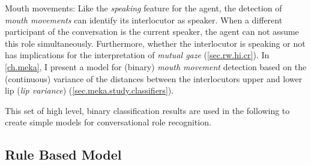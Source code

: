 \begin{description}
\item{Mouth movements:} Like the \emph{speaking} feature for the agent, the detection of \emph{mouth movements} can identify its interlocutor as \gls{speaker}.
When a different participant of the \gls{conversation} is the current \gls{speaker}, the agent can not assume this role simultaneously.
Furthermore, whether the interlocutor is speaking or not has implications for the interpretation of \emph{mutual gaze} (\cref{sec.rw.hi.cr}).
In \cref{ch.meka}, I present a model for (binary) \emph{mouth movement} detection based on the (continuous) variance of the distances between the interlocutors upper and lower lip (\emph{lip variance}) (\cref{sec.meka.study.classifiers}).
\end{description}
This set of high level, binary classification results are used in the following to create simple models for \gls{conversational role} recognition.

\subsection{Rule Based Model}

